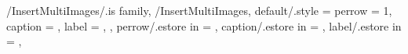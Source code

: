 \newcommand\MultiImageId{0}
\newcommand{\SetMultiImageId}[1]
  {\renewcommand{\MultiImageId}{#1}}
\newcommand{\GetMultiImageId}[0]{\MultiImageId}

\newcommand\WidthOfImagePerRow{0}

\newcommand{\SubfigureBreakSpaceLine}[1]
{
  \ifthenelse{\equal{\intcalcMod{
    \GetMultiImageId - 1}{\GetMultiImagesPerRow}}{0}}%
  {%

  } %
  {%
    ~
  } %
} %

\newcommand{\SetWidthOfImagePerRow}
{
  \ifthenelse{\equal{\GetMultiImagesPerRow}{1}}
  {
    \FPeval{\WidthOfImagePerRow}{1.0}
  } %
  {
    \provideboolean{WidthOfImagePerRowTmpIsDone}
    \setboolean{WidthOfImagePerRowTmpIsDone}{false}
    \FPeval{\TmpRemain}{
      clip((\GetMultiImageTotalValue) - (\GetMultiImageId))}
    \modulo{\GetMultiImageTotalValue}{\GetMultiImagesPerRow}
    \FPiflt{\TmpRemain}{\GetMultiImagesPerRow}
    \else
      \setboolean{WidthOfImagePerRowTmpIsDone}{true}
      \FPeval{
        \WidthOfImagePerRow}{
          clip(clip(1 / (\GetMultiImagesPerRow)) - 0.1)}
    \fi %
    \ifthenelse{\boolean{WidthOfImagePerRowTmpIsDone}}
    {}
    {
      \ifthenelse{\result = 0}
      {
        \FPeval{
          \WidthOfImagePerRow}{
            clip(clip(1 / (\GetMultiImagesPerRow)) - 0.1)}
      } %
      {
        \FPifeq{\TmpRemain}{0}
          \FPeval{\WidthOfImagePerRow}{1.0}
        \else
          \FPeval{
            \WidthOfImagePerRow}{
              clip(clip(1 / (\GetMultiImagesPerRow)) - 0.1)}
        \fi %
      } %
    } %
  } %
} %

\pgfkeys
{
  /InsertMultiImages/.is family, /InsertMultiImages,
  default/.style = 
  {
    perrow = 1,
    caption = \empty,
    label = \empty,
  },
  perrow/.estore in = \InsertMultiImagesValueImagePerRow,
  caption/.estore in = \InsertMultiImagesValueCaption,
  label/.estore in = \InsertMultiImagesValueLabel,
} %


